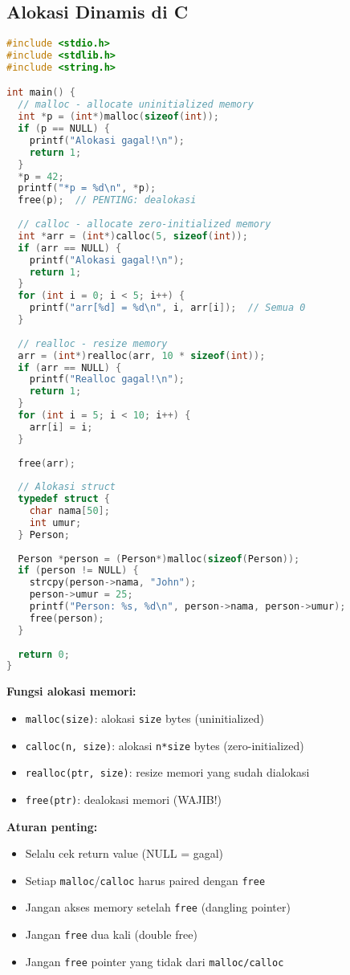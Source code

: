 \documentclass[../main.tex]{subfiles}
\begin{document}
\subsection{Alokasi Dinamis di C}

\begin{lstlisting}[language=C, caption={malloc, calloc, realloc, free di C}]
#include <stdio.h>
#include <stdlib.h>
#include <string.h>

int main() {
  // malloc - allocate uninitialized memory
  int *p = (int*)malloc(sizeof(int));
  if (p == NULL) {
    printf("Alokasi gagal!\n");
    return 1;
  }
  *p = 42;
  printf("*p = %d\n", *p);
  free(p);  // PENTING: dealokasi
  
  // calloc - allocate zero-initialized memory
  int *arr = (int*)calloc(5, sizeof(int));
  if (arr == NULL) {
    printf("Alokasi gagal!\n");
    return 1;
  }
  for (int i = 0; i < 5; i++) {
    printf("arr[%d] = %d\n", i, arr[i]);  // Semua 0
  }
  
  // realloc - resize memory
  arr = (int*)realloc(arr, 10 * sizeof(int));
  if (arr == NULL) {
    printf("Realloc gagal!\n");
    return 1;
  }
  for (int i = 5; i < 10; i++) {
    arr[i] = i;
  }
  
  free(arr);
  
  // Alokasi struct
  typedef struct {
    char nama[50];
    int umur;
  } Person;
  
  Person *person = (Person*)malloc(sizeof(Person));
  if (person != NULL) {
    strcpy(person->nama, "John");
    person->umur = 25;
    printf("Person: %s, %d\n", person->nama, person->umur);
    free(person);
  }
  
  return 0;
}
\end{lstlisting}

\textbf{Fungsi alokasi memori:}
\begin{itemize}
  \item \texttt{malloc(size)}: alokasi \texttt{size} bytes (uninitialized)
  \item \texttt{calloc(n, size)}: alokasi \texttt{n*size} bytes (zero-initialized)
  \item \texttt{realloc(ptr, size)}: resize memori yang sudah dialokasi
  \item \texttt{free(ptr)}: dealokasi memori (WAJIB!)
\end{itemize}

\textbf{Aturan penting:}
\begin{itemize}
  \item Selalu cek return value (NULL = gagal)
  \item Setiap \texttt{malloc}/\texttt{calloc} harus paired dengan \texttt{free}
  \item Jangan akses memory setelah \texttt{free} (dangling pointer)
  \item Jangan \texttt{free} dua kali (double free)
  \item Jangan \texttt{free} pointer yang tidak dari \texttt{malloc/calloc}
\end{itemize}
\end{document}
